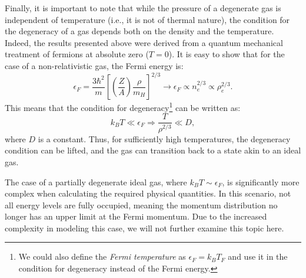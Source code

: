 \documentclass[main.tex]{subfiles}
\begin{document}
Finally, it is important to note that while the pressure of a degenerate gas is independent of temperature (i.e., it is not of thermal nature), the condition for the degeneracy of a gas depends both on the density and the temperature. Indeed, the results presented above were derived from a quantum mechanical treatment of fermions at absolute zero ($T=0$). It is easy to show that for the case of a non-relativistic gas, the Fermi energy is:
$$\epsilon_F = \frac{3\hbar^2}{m} \left[\left( \frac{Z}{A} \right) \frac{\rho}{m_H} \right]^{2/3} \longrightarrow \epsilon_F \propto n_e^{2/3} \propto \rho_e^{2/3}.$$
This means that the condition for degeneracy\footnote{We could also define the \textit{Fermi temperature} as $\epsilon_F = k_B T_F$ and use it in the condition for degeneracy instead of the Fermi energy.} can be written as:
$$k_B T \ll \epsilon_F \Rightarrow \frac{T}{\rho^{2/3}} \ll D,$$
where $D$ is a constant. Thus, for sufficiently high temperatures, the degeneracy condition can be lifted, and the gas can transition back to a state akin to an ideal gas.

The case of a partially degenerate ideal gas, where $k_B T \sim \epsilon_F$, is significantly more complex when calculating the required physical quantities. In this scenario, not all energy levels are fully occupied, meaning the momentum distribution no longer has an upper limit at the Fermi momentum. Due to the increased complexity in modeling this case, we will not further examine this topic here.
\end{document}
